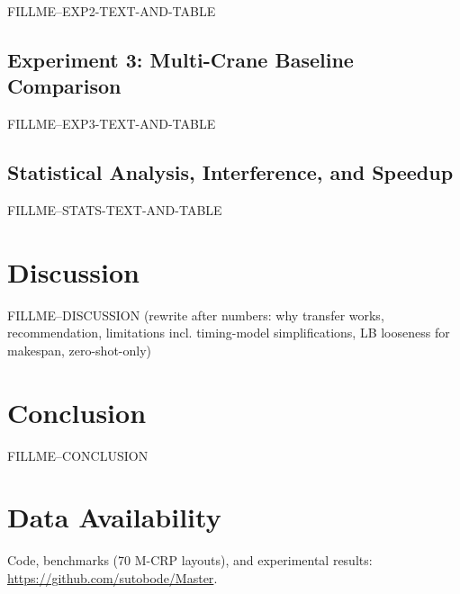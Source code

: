 \documentclass[11pt,a4paper]{elsarticle}
\begin{document}
FILLME--EXP2-TEXT-AND-TABLE

\subsection{Experiment 3: Multi-Crane Baseline Comparison}

FILLME--EXP3-TEXT-AND-TABLE

\subsection{Statistical Analysis, Interference, and Speedup}

FILLME--STATS-TEXT-AND-TABLE

\section{Discussion}
\label{sec:discussion}

FILLME--DISCUSSION (rewrite after numbers: why transfer works, recommendation, limitations incl. timing-model simplifications, LB looseness for makespan, zero-shot-only)

\section{Conclusion}

FILLME--CONCLUSION

\section*{Data Availability}
Code, benchmarks (70 M-CRP layouts), and experimental results: \url{https://github.com/sutobode/Master}.
\end{document}
